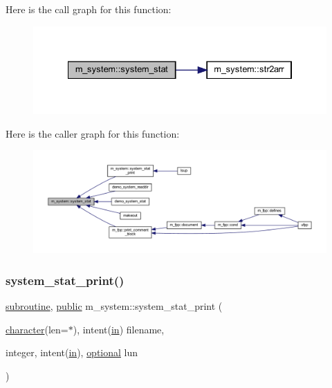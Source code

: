 Here is the call graph for this function\+:
\nopagebreak
\begin{figure}[H]
\begin{center}
\leavevmode
\includegraphics[width=334pt]{namespacem__system_a5bb1ebcebe181e07fd24e908cacc9887_cgraph}
\end{center}
\end{figure}
Here is the caller graph for this function\+:
\nopagebreak
\begin{figure}[H]
\begin{center}
\leavevmode
\includegraphics[width=350pt]{namespacem__system_a5bb1ebcebe181e07fd24e908cacc9887_icgraph}
\end{center}
\end{figure}
\mbox{\label{namespacem__system_aa26c234da8b559f549db4dbe446b8acc}} 
\subsubsection{\texorpdfstring{system\+\_\+stat\+\_\+print()}{system\_stat\_print()}}
{\footnotesize\ttfamily \hyperlink{M__stopwatch_83_8txt_acfbcff50169d691ff02d4a123ed70482}{subroutine}, \hyperlink{M__stopwatch_83_8txt_a2f74811300c361e53b430611a7d1769f}{public} m\+\_\+system\+::system\+\_\+stat\+\_\+print (\begin{DoxyParamCaption}\item[{\hyperlink{option__stopwatch_83_8txt_abd4b21fbbd175834027b5224bfe97e66}{character}(len=$\ast$), intent(\hyperlink{M__journal_83_8txt_afce72651d1eed785a2132bee863b2f38}{in})}]{filename,  }\item[{integer, intent(\hyperlink{M__journal_83_8txt_afce72651d1eed785a2132bee863b2f38}{in}), \hyperlink{option__stopwatch_83_8txt_aa4ece75e7acf58a4843f70fe18c3ade5}{optional}}]{lun }\end{DoxyParamCaption})}



